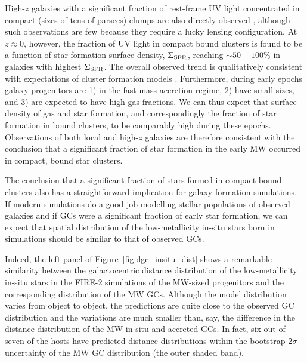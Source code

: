 \documentclass[a4paper,useAMS,usenatbib]{mnras}
\begin{document}
High-$z$ galaxies with a significant fraction of rest-frame UV light concentrated in compact (sizes of tens of parsecs) clumps
are also directly observed \citep[e.g.,][]{Livermore.etal.2015,Johnson.etal.2017,Vanzella.etal.2023}, although such observations are few because they require a lucky lensing configuration.
At $z\approx 0$, however, the fraction of UV light in compact bound clusters is found to be a function of star formation surface density,  $\Sigma_{\rm SFR}$, \citep[e.g.,][see also \citealt{Adamo.etal.2020rev}  for a review]{Adamo.etal.2020} reaching $\sim 50-100\%$ in galaxies with highest $\Sigma_{\rm SFR}$. The overall observed trend is qualitatively consistent with expectations of cluster formation models \citep{Kruijssen2012}. Furthermore,  during early epochs galaxy progenitors are 1) in the fast mass accretion regime, 2) have small sizes, and 3) are expected to have high gas fractions. We can thus expect 
that surface density of gas and star formation, and correspondingly the fraction of star formation in bound clusters, to be comparably high during these epochs. 
Observations of both local and high-$z$ galaxies are therefore consistent with the conclusion that a significant fraction of star formation in the early MW occurred in compact, bound star clusters. 

The conclusion that a significant fraction of stars formed in compact bound clusters also has a straightforward implication for galaxy formation simulations. If modern simulations do a good job modelling stellar populations of observed galaxies \citep[see][for reviews of recent dramatic progress in such simulations]{Naab.Ostriker.2017,Vogelsberger.etal.2020} and if GCs were a significant fraction of early star formation, we can expect that spatial distribution of the low-metallicity in-situ stars born in simulations should be similar to that of observed GCs. 

Indeed, the left panel of Figure~\ref{fig:dgc_insitu_dist} shows a remarkable similarity between the galactocentric distance distribution of the low-metallicity in-situ stars in the FIRE-2 simulations \citep{Hopkins.etal.2018,Wetzel.etal.2023} of the MW-sized progenitors and 
the corresponding distribution of the MW GCs. Although the model distribution varies from object to object, the predictions are quite close to the observed GC distribution and the variations are much smaller than, say, the difference in the distance distribution of the MW in-situ and accreted GCs. In fact, six out of seven of the hosts have predicted distance distributions within the bootstrap $2\sigma$ uncertainty of the MW GC distribution (the outer shaded band).  
\end{document}

